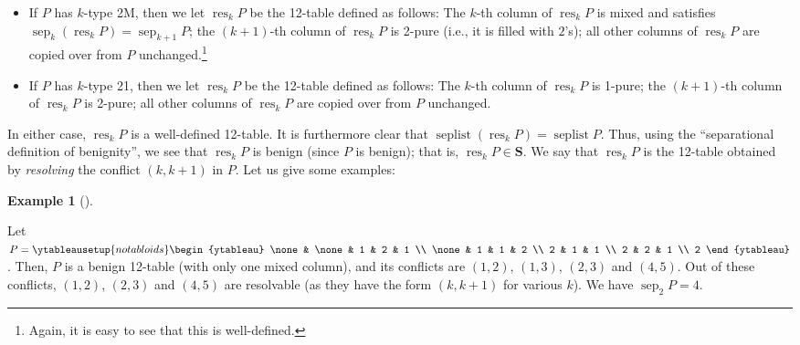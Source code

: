 \documentclass[numbers=enddot,12pt,final,onecolumn,notitlepage]{scrartcl}%
\theoremstyle{definition}
\newtheorem{exmp}[theo]{Example}
\newenvironment{example}[1][]
{\begin{exmp}[#1]\begin{leftbar}}
{\end{leftbar}\end{exmp}}
\newenvironment{vershort}{}{}
\begin{document}
\begin{vershort}
\begin{itemize}
\item If $P$ has $k$-type 2M, then we let $\operatorname*{res}_{k}P$ be the
12-table defined as follows: The $k$-th column of $\operatorname*{res}_{k}P$
is mixed and satisfies $\operatorname*{sep}\nolimits_{k}\left(
\operatorname*{res}\nolimits_{k}P\right)  =\operatorname*{sep}\nolimits_{k+1}%
P$; the $\left(  k+1\right)  $-th column of $\operatorname*{res}%
\nolimits_{k}P$ is 2-pure (i.e., it is filled with $2$'s); all other columns
of $\operatorname*{res}\nolimits_{k}P$ are copied over from $P$
unchanged.\footnote{Again, it is easy to see that this is well-defined.}

\item If $P$ has $k$-type 21, then we let $\operatorname*{res}_{k}P$ be the
12-table defined as follows: The $k$-th column of $\operatorname*{res}_{k}P$
is 1-pure; the $\left(  k+1\right)  $-th column of $\operatorname*{res}%
\nolimits_{k}P$ is 2-pure; all other columns of $\operatorname*{res}%
\nolimits_{k}P$ are copied over from $P$ unchanged.
\end{itemize}

In either case, $\operatorname*{res}\nolimits_{k}P$ is a well-defined
12-table. It is furthermore clear that $\operatorname*{seplist}\left(
\operatorname*{res}\nolimits_{k}P\right)  =\operatorname*{seplist}P$. Thus,
using the \textquotedblleft separational definition of
benignity\textquotedblright, we see that $\operatorname*{res}\nolimits_{k}P$
is benign (since $P$ is benign); that is, $\operatorname*{res}\nolimits_{k}%
P\in\mathbf{S}$. We say that $\operatorname*{res}\nolimits_{k}P$ is the
12-table obtained by \textit{resolving} the conflict $\left(  k,k+1\right)  $
in $P$. Let us give some examples:


\begin{example}
\label{exa.resolve.short}Let $P=%
\ytableausetup{notabloids}
\begin{ytableau}
\none& \none& 1 & 2 & 1 \\
\none& 1 & 1 & 2 \\
2 & 1 & 1 \\
2 & 2 & 1 \\
2
\end{ytableau}%
$. Then, $P$ is a benign 12-table (with only one mixed column), and its
conflicts are $\left(  1,2\right)  $, $\left(  1,3\right)  $, $\left(
2,3\right)  $ and $\left(  4,5\right)  $. Out of these conflicts, $\left(
1,2\right)  $, $\left(  2,3\right)  $ and $\left(  4,5\right)  $ are
resolvable (as they have the form $\left(  k,k+1\right)  $ for various $k$).
We have $\operatorname*{sep}\nolimits_{2}P=4$.


\end{example}
\end{vershort}
\end{document}
